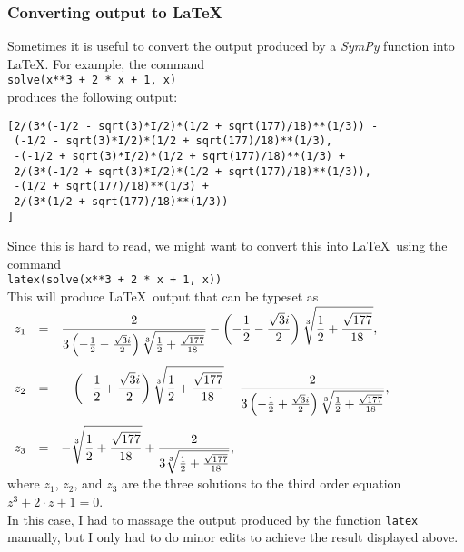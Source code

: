 \documentclass{article}
\newcommand{\ds}{\displaystyle}
\begin{document}
\subsubsection{Converting output to \LaTeX}
Sometimes it is useful to convert the output produced by a \textsl{SymPy} function into \LaTeX.
For example, the command
\\[0.2cm]
\hspace*{1.3cm}
\texttt{solve(x**3 + 2 * x + 1, x)}
\\[0.2cm]
produces the following output:
\begin{verbatim}
[2/(3*(-1/2 - sqrt(3)*I/2)*(1/2 + sqrt(177)/18)**(1/3)) - 
 (-1/2 - sqrt(3)*I/2)*(1/2 + sqrt(177)/18)**(1/3), 
 -(-1/2 + sqrt(3)*I/2)*(1/2 + sqrt(177)/18)**(1/3) + 
 2/(3*(-1/2 + sqrt(3)*I/2)*(1/2 + sqrt(177)/18)**(1/3)), 
 -(1/2 + sqrt(177)/18)**(1/3) + 
 2/(3*(1/2 + sqrt(177)/18)**(1/3))
]
\end{verbatim}
Since this is hard to read, we might want to convert this into \LaTeX\ using the command
\\[0.2cm]
\hspace*{1.3cm}
\texttt{latex(solve(x**3 + 2 * x + 1, x))}
\\[0.2cm]
This will produce \LaTeX\ output that can be typeset as
\\[0.2cm]
\hspace*{1.3cm}
$\begin{array}[t]{lcl}
 z_1 & = & \ds \frac{2}{3 \left(- \frac{1}{2} - \frac{\sqrt{3} i}{2}\right)
  \sqrt[3]{\frac{1}{2} + \frac{\sqrt{177}}{18}}} - \left(- \frac{1}{2} - \frac{\sqrt{3}i}{2}\right) \sqrt[3]{\frac{1}{2} + \frac{\sqrt{177}}{18}}, \\[0.8cm]
 z_2 & = & \ds - \left(- \frac{1}{2} +  \frac{\sqrt{3} i}{2}\right) \sqrt[3]{\frac{1}{2} + \frac{\sqrt{177}}{18}} + \frac{2}{3
  \left(- \frac{1}{2} + \frac{\sqrt{3} i}{2}\right) \sqrt[3]{\frac{1}{2} +
    \frac{\sqrt{177}}{18}}}, \\[0.8cm]
 z_3 & = & \ds - \sqrt[3]{\frac{1}{2} + \frac{\sqrt{177}}{18}} + \frac{2}{3
  \sqrt[3]{\frac{1}{2} + \frac{\sqrt{177}}{18}}},
\end{array}
$
\\[0.2cm]
where $z_1$, $z_2$, and $z_3$ are the three solutions to the third order equation
\\[0.2cm]
\hspace*{1.3cm}
$z^3 + 2 \cdot z + 1 = 0$.
\\[0.2cm]
In this case, I had to massage the output produced by the function \texttt{latex} manually, but I
only had to do minor edits to achieve the result displayed above.
\end{document}
